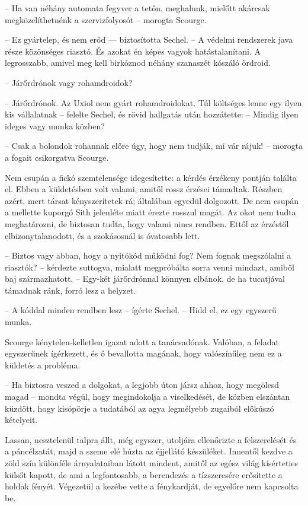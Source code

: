 \documentclass{thesis-ekf}
\theoremstyle{definition}
\begin{document}
-- Ha van néhány automata fegyver a tetőn, meghalunk, mielőtt akárcsak megközelíthetnénk
a szervizfolyosót -- morogta Scourge.

-- Ez gyártelep, és nem erőd — biztosította Sechel. -- A védelmi rendszerek java része
közönséges riasztó. És azokat én képes vagyok hatástalanítani. A legrosszabb, amivel meg
kell birkóznod néhány szanaszét kószáló őrdroid.

-- Járőrdrónok vagy rohamdroidok?

-- Járőrdrónok. Az Uxiol nem gyárt rohamdroidokat. Túl költséges lenne egy ilyen kis
vállalatnak -- felelte Sechel, és rövid hallgatás után hozzátette: -- Mindig ilyen ideges vagy
munka közben?

-- Csak a bolondok rohannak előre úgy, hogy nem tudják, mi vár rájuk! -- morogta a fogait
csikorgatva Scourge.

Nem csupán a fickó szemtelensége idegesítette: a kérdés érzékeny pontján találta el. Ebben
a küldetésben volt valami, amitől rossz érzései támadtak. Részben azért, mert társat
kényszerítetek rá; általában egyedül dolgozott. De nem csupán a mellette kuporgó Sith
jelenléte miatt érezte rosszul magát. Az okot nem tudta meghatározni, de biztosan tudta, hogy
valami nincs rendben. Ettől az érzéstől elbizonytalanodott, és a szokásosnál is óvatosabb lett.

-- Biztos vagy abban, hogy a nyitókód működni fog? Nem fognak megszólalni a riasztók? --
kérdezte suttogva, mialatt megpróbálta sorra venni mindazt, amiből baj származhatott. -- Egy-két járőrdrónnal könnyen elbánok, de ha tucatjával támadnak ránk, forró lesz a helyzet.

-- A kóddal minden rendben lesz -- ígérte Sechel. -- Hidd el, ez egy egyszerű munka.

Scourge kénytelen-kelletlen igazat adott a tanácsadónak. Valóban, a feladat egyszerűnek
ígérkezett, és ő bevallotta magának, hogy valószínűleg nem ez a küldetés a probléma.

-- Ha biztosra veszed a dolgokat, a legjobb úton jársz ahhoz, hogy megölesd magad --
mondta végül, hogy megindokolja a viselkedését, de közben elszántan küzdött, hogy kisöpörje a
tudatából az agya legmélyebb zugaiból előkúszó kételyeit.

Lassan, nesztelenül talpra állt, még egyszer, utoljára ellenőrizte a felszerelését és a
páncélzatát, majd a szeme elé húzta az éjjellátó készüléket. Innentől kezdve a zöld szín
különféle árnyalataiban látott mindent, amitől az egész világ kísérteties külsőt kapott, de ami a
legfontosabb, a berendezés a tízszeresére erősítette a holdak fényét. Végezetül a kezébe
vette a fénykardját, de egyelőre nem kapcsolta be.
\end{document}
